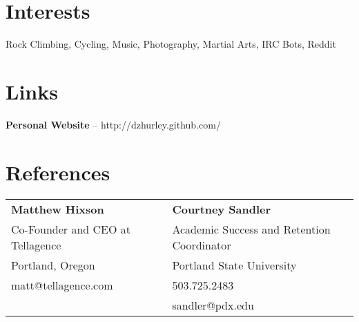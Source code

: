 \documentclass[margin,line]{resume}
\begin{document}
\begin{resume}
    \section{\mysidestyle Interests}

    Rock Climbing, Cycling, Music, Photography, Martial Arts, IRC Bots, Reddit

    \section{\mysidestyle Links}

    \textbf{Personal Website} -- http://dzhurley.github.com/

    \section{\mysidestyle References}

    \vspace{1mm}
    \begin{tabular}{@{}ll}
        \textbf{Matthew Hixson}           &  \textbf{Courtney Sandler}                   \\
        Co-Founder and CEO at Tellagence  &  Academic Success and Retention Coordinator  \\
        Portland, Oregon                  &  Portland State University                   \\
        matt@tellagence.com               &  503.725.2483                                \\
                                          &  sandler@pdx.edu                             \\
    \end{tabular}

\end{resume}
\end{document}
